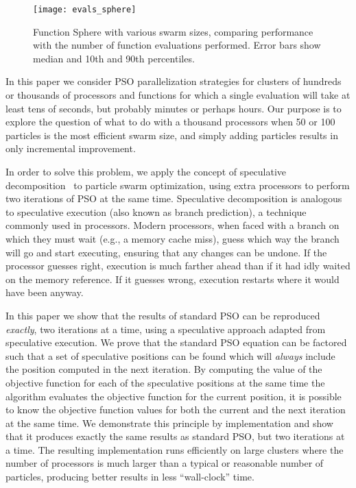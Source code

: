\documentclass[smallcondensed]{svjour3}
\begin{document}
\begin{figure}
  \centering
  \texttt{[image: evals\_sphere]}
  \caption{Function Sphere with various swarm sizes, comparing performance with
  the number of function evaluations performed.  Error bars show median and
  10th and 90th percentiles.}
  \label{fig:evals-sphere}
\end{figure}

In this paper we consider PSO parallelization strategies for clusters of
hundreds or thousands of processors and functions for which a single evaluation
will take at least tens of seconds, but probably minutes or perhaps hours.  Our
purpose is to explore the question of what to do with a thousand processors
when 50 or 100 particles is the most efficient swarm size, and simply
adding particles results in only incremental improvement.

In order to solve this problem, we apply the concept of speculative
decomposition~\citep{grama-2003-intro-to-parallel-computing} to particle swarm
optimization, using extra processors to perform two iterations of PSO at the
same time.  Speculative decomposition is analogous to speculative execution
(also known as branch prediction), a technique commonly used in processors.
Modern processors, when faced with a branch on which they must wait (e.g., a
memory cache miss), guess which way the branch will go and start executing,
ensuring that any changes can be undone.  If the processor guesses right,
execution is much farther ahead than if it had idly waited on the memory
reference.  If it guesses wrong, execution restarts where it would have been
anyway.  

In this paper we show that the results of standard PSO can be reproduced
\emph{exactly}, two iterations at a time, using a speculative approach adapted
from speculative execution. We prove that the standard PSO equation can be
factored such that a set of speculative positions can be found which will
\emph{always} include the position computed in the next iteration.  By
computing the value of the objective function for each of the speculative
positions at the same time the algorithm evaluates the objective function for
the current position, it is possible to know the objective function values for
both the current and the next iteration at the same time.  We demonstrate this
principle by implementation and show that it produces exactly the same results
as standard PSO, but two iterations at a time.  The resulting implementation
runs efficiently on large clusters where the number of processors is much
larger than a typical or reasonable number of particles, producing better
results in less ``wall-clock'' time.
\end{document}

